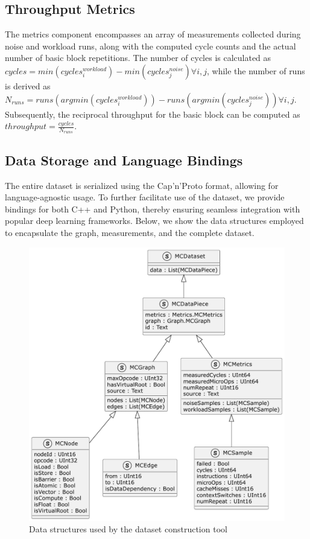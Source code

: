 \subsection{Throughput Metrics}

The metrics component encompasses an array of measurements collected during noise and workload runs, along with the computed cycle counts and the actual number of basic block repetitions. The number of cycles is calculated as
$cycles = min(cycles^{workload}_i) - min(cycles^{noise}_j) \forall i, j$, while the number of runs is derived as $N_{runs} = runs(argmin(cycles^{workload}_i)) - runs(argmin(cycles^{noise}_j)) \forall i, j$. Subsequently, the reciprocal throughput for the basic block can be computed as $throughput = \frac{cycles}{N_{runs}}$.

\subsection{Data Storage and Language Bindings}

The entire dataset is serialized using the Cap'n'Proto format, allowing for language-agnostic usage. To further facilitate use of the dataset, we provide bindings for both C++ and Python, thereby ensuring seamless integration with popular deep learning frameworks. Below, we show the data structures employed to encapsulate the graph, measurements, and the complete dataset.

\begin{figure}[h]
  \caption{Data structures used by the dataset construction tool}
  \centering
  \includegraphics[width=0.9\columnwidth]{data_structures}
\end{figure}

